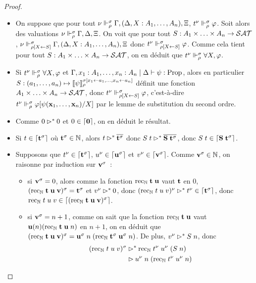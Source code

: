 \documentclass{article}
\begin{document}
\begin{proof}
\begin{itemize}
  \item On suppose que pour tout $\nu\Vdash_\rho^\sigma \Gamma, (\Delta, X : A_1,\ldots,A_n), \Xi$, $t^\nu \Vdash_\rho^\sigma \varphi$. Soit alors des valuations $\nu\Vdash_\rho^\sigma\Gamma, \Delta,\Xi$. On voit que pour tout $S : A_1\times\ldots\times A_n \to \mathcal {SAT}$, $\nu\Vdash_{\rho[X\leftarrow S]}^\sigma \Gamma, (\Delta, X : A_1,\ldots,A_n),\Xi$ donc $t^\nu\Vdash_{\rho[X\leftarrow S]}^\sigma \varphi$. Comme cela tient pour tout $S : A_1\times\ldots\times A_n \to \mathcal {SAT}$, on en déduit que $t^\nu\Vdash_\rho^\sigma \forall X, \varphi$.
  \item Si $t^\nu\Vdash_\rho^\sigma \forall X, \varphi$ et $\Gamma,x_1 : A_1,\ldots,x_n : A_n\mid\Delta\vdash \psi : \mathrm{Prop}$, alors en particulier $S : (a_1,\ldots,a_n) \mapsto \llbracket \psi \rrbracket_\rho^{\sigma[x_1\leftarrow a_1,\ldots, x_n \leftarrow a_n]}$ définit une fonction $A_1\times\ldots\times A_n \to\mathcal {SAT}$, donc $t^\nu\Vdash_{\rho[X\leftarrow S]}^\sigma \varphi$, c'est-à-dire $t^\nu\Vdash_\rho^\sigma \varphi[\psi(\mathbf{x}_1,\ldots,\mathbf{x}_n)/X]$ par le lemme de substitution du second ordre.
  \item Comme $0\rhd^* 0$ et $0\in\lceil \boldsymbol 0 \rceil$, on en déduit le résultat.
  \item Si $t\in\lceil \mathbf{t}^\sigma \rceil$ où $\mathbf{t}^\sigma \in \mathbb{N}$, alors $t\rhd^* \overline{\mathbf{t}^\sigma}$ donc $S\;t\rhd^*\overline{\mathbf{S}\;\mathbf{t}^\sigma}$, donc $S\;t\in\lceil \mathbf{S}\;\mathbf{t}^\sigma \rceil$.
  \item Supposons que $t^\nu\in\lceil \mathbf{t}^\sigma \rceil$, $u^\nu\in\lceil \mathbf{u}^\sigma \rceil$ et $v^\nu\in\lceil \mathbf{v}^\sigma \rceil$. Comme $\mathbf{v}^\sigma\in\mathbb{N}$, on raisonne par induction sur $\mathbf{v}^\sigma$~:
    \begin{itemize}
    \item si $\mathbf{v}^\sigma = 0$, alors comme la fonction $\mathrm{rec}_{\mathbb{N}}\;\mathbf{t}\;\mathbf{u}$ vaut $\mathbf{t}$ en $0$, $(\mathrm{rec}_{\mathbb{N}}\;\mathbf{t}\;\mathbf{u}\;\mathbf{v})^\sigma = \mathbf{t}^\sigma$ et $v^\nu \rhd^* 0$, donc $(\mathrm{rec}_{\mathbb{N}}\;t\;u\;v)^\nu \rhd^* t^\nu \in \lceil \mathbf{t}^\sigma \rceil$, donc $\mathrm{rec}_{\mathbb{N}}\;t\;u\;v \in \lceil (\mathrm{rec}_{\mathbb{N}}\;\mathbf{t}\;\mathbf{u}\;\mathbf{v})^\sigma \rceil$.
    \item si $\mathbf{v}^\sigma = n + 1$, comme on sait que la fonction $\mathrm{rec}_{\mathbb{N}}\;\mathbf{t}\;\mathbf{u}$ vaut $\mathbf{u}(n)(\mathrm{rec}_{\mathbb{N}}\;\mathbf{t}\;\mathbf{u}\;n)$ en $n+1$, on en déduit que $(\mathrm{rec}_{\mathbb{N}}\;\mathbf{t}\;\mathbf{u}\;\mathbf{v})^\sigma = \mathbf{u}^\sigma\;n\;(\mathrm{rec}_{\mathbb{N}}\;\mathbf{t}^\sigma\;\mathbf{u}^\sigma\;n)$. De plus, $v^\nu \rhd^* S\;n$, donc
      \begin{align*}
        (\rec_\bN\;t\;u\;v)^\sigma &\reduc^* \rec_\bN\;t^\nu\;u^\nu\;(S\;n)\\
        &\reduc u^\nu\;n\;(\rec_\bN\;t^\nu\;u^\nu\;n)

\end{align*}
\end{itemize}
\end{itemize}
\end{proof}
\end{document}

